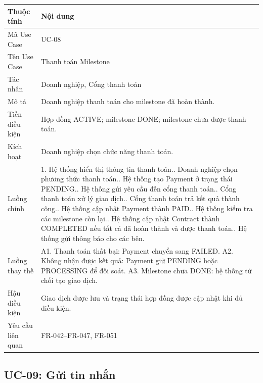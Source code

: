 \begin{longtable}{|p{3.5cm}|p{10.2cm}|}
\hline
\textbf{Thuộc tính} & \textbf{Nội dung} \\ \hline
Mã Use Case & UC-08 \\ \hline
Tên Use Case & Thanh toán Milestone \\ \hline
Tác nhân & Doanh nghiệp, Cổng thanh toán \\ \hline
Mô tả & Doanh nghiệp thanh toán cho milestone đã hoàn thành. \\ \hline
Tiền điều kiện & Hợp đồng ACTIVE; milestone DONE; milestone chưa được thanh toán. \\ \hline
Kích hoạt & Doanh nghiệp chọn chức năng thanh toán. \\ \hline
Luồng chính &
1. Hệ thống hiển thị thông tin thanh toán.\newline
2. Doanh nghiệp chọn phương thức thanh toán.\newline
3. Hệ thống tạo Payment ở trạng thái PENDING.\newline
4. Hệ thống gửi yêu cầu đến cổng thanh toán.\newline
5. Cổng thanh toán xử lý giao dịch.\newline
6. Cổng thanh toán trả kết quả thành công.\newline
7. Hệ thống cập nhật Payment thành PAID.\newline
8. Hệ thống kiểm tra các milestone còn lại.\newline
9. Hệ thống cập nhật Contract thành COMPLETED nếu tất cả đã hoàn thành và được thanh toán.\newline
10. Hệ thống gửi thông báo cho các bên. \\ \hline
Luồng thay thế &
A1. Thanh toán thất bại: Payment chuyển sang FAILED.\newline
A2. Không nhận được kết quả: Payment giữ PENDING hoặc PROCESSING để đối soát.\newline
A3. Milestone chưa DONE: hệ thống từ chối tạo giao dịch. \\ \hline
Hậu điều kiện & Giao dịch được lưu và trạng thái hợp đồng được cập nhật khi đủ điều kiện. \\ \hline
Yêu cầu liên quan & FR-042--FR-047, FR-051 \\ \hline
\end{longtable}

\subsection{UC-09: Gửi tin nhắn}

